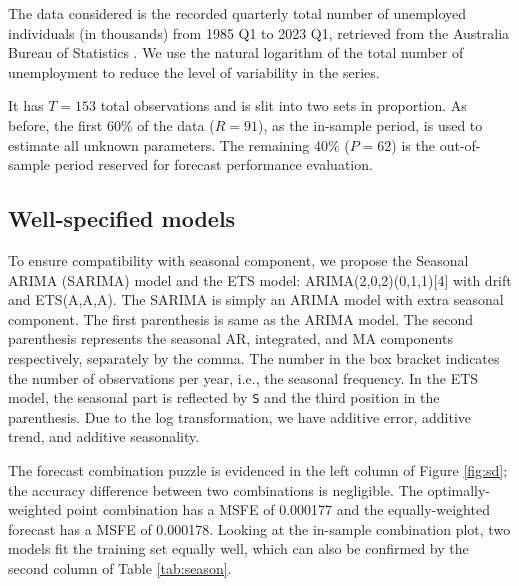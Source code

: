 \documentclass{monashthesis}
\begin{document}
The data considered is the recorded quarterly total number of unemployed individuals (in thousands) from 1985 Q1 to 2023 Q1, retrieved from the Australia Bureau of Statistics \autocite{ABS}. We use the natural logarithm of the total number of unemployment to reduce the level of variability in the series.

It has \(T = 153\) total observations and is slit into two sets in proportion. As before, the first 60\% of the data (\(R = 91\)), as the in-sample period, is used to estimate all unknown parameters. The remaining 40\% (\(P = 62\)) is the out-of-sample period reserved for forecast performance evaluation.

\subsection*{Well-specified models}

To ensure compatibility with seasonal component, we propose the Seasonal ARIMA (SARIMA) model and the ETS model: ARIMA(2,0,2)(0,1,1){[}4{]} with drift and ETS(A,A,A). The SARIMA is simply an ARIMA model with extra seasonal component. The first parenthesis is same as the ARIMA model. The second parenthesis represents the seasonal AR, integrated, and MA components respectively, separately by the comma. The number in the box bracket indicates the number of observations per year, i.e., the seasonal frequency. In the ETS model, the seasonal part is reflected by \texttt{S} and the third position in the parenthesis. Due to the log transformation, we have additive error, additive trend, and additive seasonality.

The forecast combination puzzle is evidenced in the left column of Figure \ref{fig:sd}; the accuracy difference between two combinations is negligible. The optimally-weighted point combination has a MSFE of 0.000177 and the equally-weighted forecast has a MSFE of 0.000178. Looking at the in-sample combination plot, two models fit the training set equally well, which can also be confirmed by the second column of Table \ref{tab:season}.

\vspace{7mm}
\end{document}
